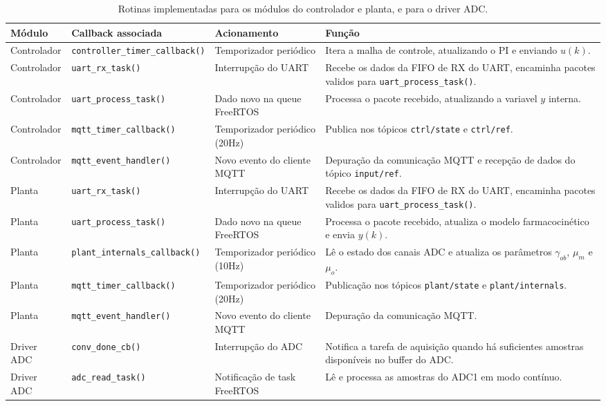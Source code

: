 \begin{table}[H]
    \centering
    \caption{Rotinas implementadas para os módulos do controlador e planta, e para o driver ADC.}
    \label{tab:tarefas_embarcadas}
    \fontsize{7.8}{9.6}\selectfont
    \renewcommand{\arraystretch}{1.22}
    \begin{tabularx}{\textwidth}{@{}p{1.6cm}p{4.0cm}p{2.35cm}X@{}}
        \toprule
        \textbf{Módulo} & \textbf{Callback associada} & \textbf{Acionamento} & \textbf{Função} \\
        \midrule
        Controlador & \texttt{controller\_timer\_callback()} & Temporizador periódico & Itera a malha de controle, atualizando o PI e enviando $u(k)$. \\
        Controlador & \texttt{uart\_rx\_task()} & Interrupção do UART & Recebe os dados da FIFO de RX do UART, encaminha pacotes validos para \texttt{uart\_process\_task()}. \\
        Controlador & \texttt{uart\_process\_task()} & Dado novo na queue FreeRTOS & Processa o pacote recebido, atualizando a variavel $y$ interna. \\
        Controlador & \texttt{mqtt\_timer\_callback()} & Temporizador periódico (20Hz) & Publica nos tópicos \texttt{ctrl/state} e \texttt{ctrl/ref}. \\
        Controlador & \texttt{mqtt\_event\_handler()} & Novo evento do cliente MQTT & Depuração da comunicação MQTT e recepção de dados do tópico \texttt{input/ref}. \\
        \midrule
        Planta & \texttt{uart\_rx\_task()} & Interrupção do UART & Recebe os dados da FIFO de RX do UART, encaminha pacotes validos para \texttt{uart\_process\_task()}. \\
        Planta & \texttt{uart\_process\_task()} & Dado novo na queue FreeRTOS & Processa o pacote recebido, atualiza o modelo farmacocinético e envia $y(k)$. \\
        Planta & \texttt{plant\_internals\_callback()} & Temporizador periódico (10Hz) & Lê o estado dos canais ADC e atualiza os parâmetros $\gamma_{ob}$, $\mu_m$ e $\mu_o$. \\
        Planta & \texttt{mqtt\_timer\_callback()} & Temporizador periódico (20Hz) & Publicação nos tópicos \texttt{plant/state} e \texttt{plant/internals}. \\
        Planta & \texttt{mqtt\_event\_handler()} & Novo evento do cliente MQTT & Depuração da comunicação MQTT. \\
        \midrule
        Driver ADC & \texttt{conv\_done\_cb()} & Interrupção do ADC & Notifica a tarefa de aquisição quando há suficientes amostras disponíveis no buffer do ADC. \\
        Driver ADC & \texttt{adc\_read\_task()} & Notificação de task FreeRTOS & Lê e processa as amostras do ADC1 em modo contínuo. \\
        \bottomrule
    \end{tabularx}
\end{table}


